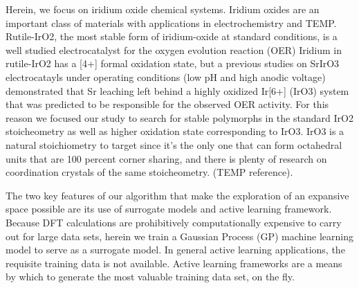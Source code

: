 Herein, we focus on iridium oxide chemical systems.
%
Iridium oxides are an important class of materials with applications in electrochemistry and TEMP.
%
Rutile-IrO2, the most stable form of iridium-oxide at standard conditions, is a well studied electrocatalyst for the oxygen evolution reaction (OER)
Iridium in rutile-IrO2 has a [4+] formal oxidation state, but a previous studies on SrIrO3 electrocatayls  under operating conditions (low pH and high anodic voltage) demonstrated that Sr leaching left behind a highly oxidized Ir[6+] (IrO3) system that was predicted to be responsible for the observed OER activity.
%
For this reason we focused our study to search for stable polymorphs in the standard IrO2 stoicheometry  as well as higher oxidation state corresponding to IrO3.
IrO3 is a natural stoichiometry to target since it's the only one that can form octahedral units that are 100 percent corner sharing, and there is plenty of research on coordination crystals of the same stoicheometry. (TEMP reference).



The two key features of our algorithm that make the exploration of an expansive space possible are its use of surrogate models and active learning framework.
%
Because DFT calculations are prohibitively computationally expensive to carry out for large data sets, herein we train a Gaussian Process (GP) machine learning model to serve as a surrogate model.
%
In general active learning applications, the requisite training data is not available.
%
Active learning frameworks are a means by which to generate the most valuable training data set, on the fly.


